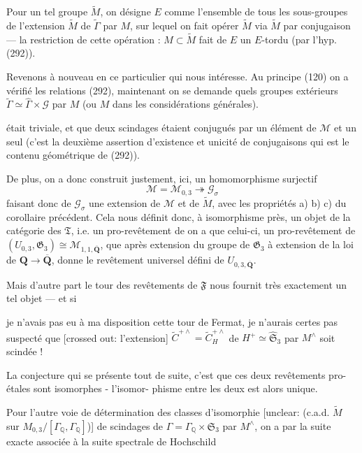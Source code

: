 Pour un tel groupe $\tilde{M}$, on désigne $E$ comme l'ensemble de tous les sous-groupes de l'extension $\tilde{M}$ de $\tilde{\Gamma}$ par $M$, sur lequel on fait opérer $\tilde{M}$ via $\tilde{M}$ par conjugaison — la restriction de cette opération : $M \subset \tilde{M}$ fait de $E$ un $E$-tordu (par l'hyp. (292)).

Revenons à nouveau en ce particulier qui nous intéresse. Au principe (120) on a vérifié les relations (292), maintenant on se demande quels groupes extérieurs $\tilde{\Gamma} \simeq \hat{\Gamma} \times \mathcal{G}$ par $M$ (ou $M$ dans les considérations générales).

\newpage


était triviale, et que deux scindages étaient conjugués par un élément de $\mathcal{M}$ et un seul (c'est la deuxième assertion d'existence et unicité de conjugaisons qui est le contenu géométrique de (292)).

De plus, on a donc construit justement, ici, un homomorphisme surjectif
$$
\mathcal{M} = \mathcal{M}_{0,3} \twoheadrightarrow \mathcal{G}_{\sigma}
$$
faisant donc de $\mathcal{G}_{\sigma}$ une extension de $\mathcal{M}$ et de $\tilde{M}$, avec les propriétés a) b) c) du corollaire précédent. Cela nous définit donc, à isomorphisme près, un objet de la catégorie des $\mathfrak{T}$, i.e. un pro-revêtement de on a que celui-ci, un pro-revêtement de $(U_{0,3}, \mathfrak{G}_3) \cong \mathcal{M}_{1,1, \overline{\mathbf{Q}}}$, que après extension du groupe de $\mathfrak{G}_3$ à extension de la loi de $\mathbf{Q} \to \overline{\mathbf{Q}}$, donne le revêtement universel défini de $U_{0,3, \overline{\mathbf{Q}}}$.

Mais d'autre part le tour des revêtements de $\mathfrak{F}$ nous fournit très exactement un tel objet — et si

\newpage


je n'avais pas eu à ma disposition
cette tour de Fermat, je n'aurais
certes pas suspecté que [crossed out: l'extension] $\widetilde{C}^{+\wedge} = \widetilde{C}^{+\wedge}_{H}$ de
$H^+ \simeq \widehat{\mathfrak{S}}_3$ par $M^\wedge$ soit scindée !

La conjecture qui se présente tout de
suite, c'est que ces deux revêtements
pro-étales sont isomorphes - l'isomor-
phisme entre les deux est alors
unique.

Pour l'autre voie de détermination
des classes d'isomorphie [unclear: (c.a.d. $\tilde{M}$ sur $M_{0,3} / [\Gamma_{\mathbb{Q}}, \Gamma_{\mathbb{Q}}]$)]
de scindages de $\Gamma = \Gamma_{\mathbb{Q}} \times \mathfrak{S}_3$ par
$M^\wedge$, on a par la suite exacte associée
à la suite spectrale de Hochschild

